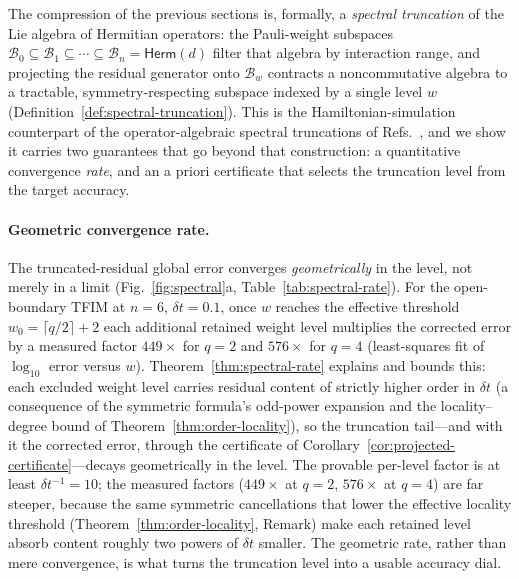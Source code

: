 \documentclass[aps,prresearch,reprint,superscriptaddress,nofootinbib,amsmath,amssymb]{revtex4-2}
\newcommand{\tfim}{TFIM}
\newcommand{\cB}{\mathcal{B}}
\newcommand{\dt}{\delta t}
\begin{document}
The compression of the previous sections is, formally, a \emph{spectral truncation} of the Lie algebra of Hermitian operators: the Pauli-weight subspaces $\cB_0\subseteq\cB_1\subseteq\cdots\subseteq\cB_n=\mathsf{Herm}(d)$ filter that algebra by interaction range, and projecting the residual generator onto $\cB_w$ contracts a noncommutative algebra to a tractable, symmetry-respecting subspace indexed by a single level $w$ (Definition~\ref{def:spectral-truncation}). This is the Hamiltonian-simulation counterpart of the operator-algebraic spectral truncations of Refs.~\cite{hashimoto2024spectral,hashimoto2023rkhm}, and we show it carries two guarantees that go beyond that construction: a quantitative convergence \emph{rate}, and an a priori certificate that selects the truncation level from the target accuracy.

\paragraph{Geometric convergence rate.} The truncated-residual global error converges \emph{geometrically} in the level, not merely in a limit (Fig.~\ref{fig:spectral}a, Table~\ref{tab:spectral-rate}). For the open-boundary \tfim{} at $n=6$, $\dt=0.1$, once $w$ reaches the effective threshold $w_0=\lceil q/2\rceil+2$ each additional retained weight level multiplies the corrected error by a measured factor $449\times$ for $q=2$ and $576\times$ for $q=4$ (least-squares fit of $\log_{10}$ error versus $w$). Theorem~\ref{thm:spectral-rate} explains and bounds this: each excluded weight level carries residual content of strictly higher order in $\dt$ (a consequence of the symmetric formula's odd-power expansion and the locality--degree bound of Theorem~\ref{thm:order-locality}), so the truncation tail---and with it the corrected error, through the certificate of Corollary~\ref{cor:projected-certificate}---decays geometrically in the level. The provable per-level factor is at least $\dt^{-1}=10$; the measured factors ($449\times$ at $q=2$, $576\times$ at $q=4$) are far steeper, because the same symmetric cancellations that lower the effective locality threshold (Theorem~\ref{thm:order-locality}, Remark) make each retained level absorb content roughly two powers of $\dt$ smaller. The geometric rate, rather than mere convergence, is what turns the truncation level into a usable accuracy dial.
\end{document}
